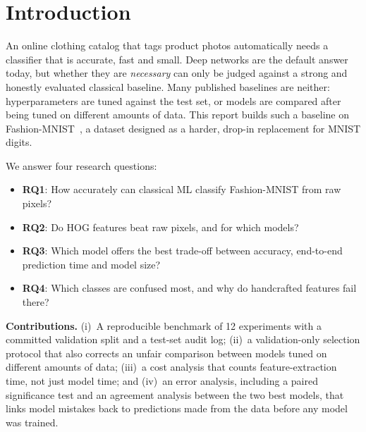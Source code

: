 \documentclass[conference]{IEEEtran}
\newcommand{\RQ}[1]{\textbf{RQ#1}}
\begin{document}
\section{Introduction}
\label{sec:intro}
An online clothing catalog that tags product photos automatically needs a classifier that is accurate, fast and
small. Deep networks are the default answer today, but whether they are \emph{necessary} can only be judged against a
strong and honestly evaluated classical baseline. Many published baselines are neither: hyperparameters are tuned against
the test set, or models are compared after being tuned on different amounts of data. This report builds such a baseline
on Fashion-MNIST~\cite{xiao2017fashion}, a dataset designed as a harder, drop-in replacement for MNIST digits.

We answer four research questions:
\begin{itemize}
  \item \RQ{1}: How accurately can classical ML classify Fashion-MNIST from raw pixels?
  \item \RQ{2}: Do HOG features beat raw pixels, and for which models?
  \item \RQ{3}: Which model offers the best trade-off between accuracy, end-to-end prediction time and model size?
  \item \RQ{4}: Which classes are confused most, and why do handcrafted features fail there?
\end{itemize}

\textbf{Contributions.}
(i)~A reproducible benchmark of 12 experiments with a committed validation split and a test-set audit log;
(ii)~a validation-only selection protocol that also corrects an unfair comparison between models tuned on different
amounts of data;
(iii)~a cost analysis that counts feature-extraction time, not just model time; and
(iv)~an error analysis, including a paired significance test and an agreement analysis between the two best models,
that links model mistakes back to predictions made from the data before any model was trained.


\end{document}

